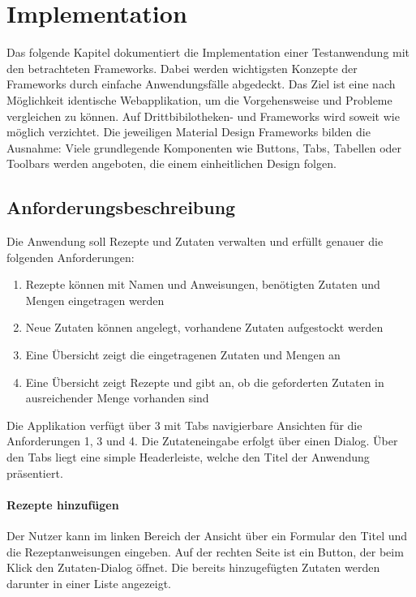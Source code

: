 \chapter{Implementation}

Das folgende Kapitel dokumentiert die Implementation einer Testanwendung mit den betrachteten Frameworks. Dabei werden wichtigsten Konzepte der Frameworks durch einfache Anwendungsfälle abgedeckt. Das Ziel ist eine nach Möglichkeit identische Webapplikation, um die Vorgehensweise und Probleme vergleichen zu können. Auf Drittbibilotheken- und Frameworks wird soweit wie möglich verzichtet. Die jeweiligen Material Design Frameworks bilden die Ausnahme: Viele grundlegende Komponenten wie Buttons, Tabs, Tabellen oder Toolbars werden angeboten, die einem einheitlichen Design folgen.

\section{Anforderungsbeschreibung}

Die Anwendung soll Rezepte und Zutaten verwalten und erfüllt genauer die folgenden Anforderungen:
\begin{enumerate}
    \item Rezepte können mit Namen und Anweisungen, benötigten Zutaten und Mengen eingetragen werden
    \item Neue Zutaten können angelegt, vorhandene Zutaten aufgestockt werden
    \item Eine Übersicht zeigt die eingetragenen Zutaten und Mengen an
    \item Eine Übersicht zeigt Rezepte und gibt an, ob die geforderten Zutaten in ausreichender Menge vorhanden sind
\end{enumerate}

Die Applikation verfügt über 3 mit Tabs navigierbare Ansichten für die Anforderungen 1, 3 und 4. Die Zutateneingabe erfolgt über einen Dialog. Über den Tabs liegt eine simple Headerleiste, welche den Titel der Anwendung präsentiert.

\subsubsection{Rezepte hinzufügen}

Der Nutzer kann im linken Bereich der Ansicht über ein Formular den Titel und die Rezeptanweisungen eingeben. Auf der rechten Seite ist ein Button, der beim Klick den Zutaten-Dialog öffnet. Die bereits hinzugefügten Zutaten werden darunter in einer Liste angezeigt. 


